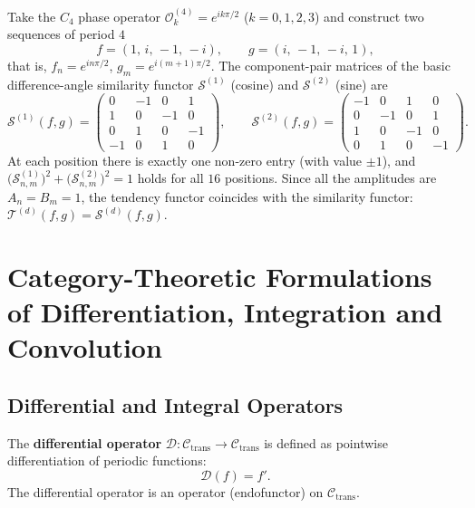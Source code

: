 \begin{example}\label{ch13_c4_similarity_example}
Take the $C_4$ phase operator $\mathcal{O}_k^{(4)} = e^{i k\pi/2}$ ($k = 0,1,2,3$) and construct two sequences of period $4$
\[
f = (1,\, i,\, -1,\, -i), \qquad g = (i,\, -1,\, -i,\, 1),
\]
that is, $f_n = e^{i n\pi/2}$, $g_m = e^{i (m+1)\pi/2}$. The component-pair matrices of the basic difference-angle similarity functor $\mathcal{S}^{(1)}$ (cosine) and $\mathcal{S}^{(2)}$ (sine) are
\[
\mathcal{S}^{(1)}(f, g) =
\begin{pmatrix}
0 & -1 & 0 & 1 \\
1 & 0 & -1 & 0 \\
0 & 1 & 0 & -1 \\
-1 & 0 & 1 & 0
\end{pmatrix}, \qquad
\mathcal{S}^{(2)}(f, g) =
\begin{pmatrix}
-1 & 0 & 1 & 0 \\
0 & -1 & 0 & 1 \\
1 & 0 & -1 & 0 \\
0 & 1 & 0 & -1
\end{pmatrix}.
\]
At each position there is exactly one non-zero entry (with value $\pm 1$), and $\big(\mathcal{S}^{(1)}_{n,m}\big)^2 + \big(\mathcal{S}^{(2)}_{n,m}\big)^2 = 1$ holds for all $16$ positions. Since all the amplitudes are $A_n = B_m = 1$, the tendency functor coincides with the similarity functor: $\mathcal{T}^{(d)}(f, g) = \mathcal{S}^{(d)}(f, g)$.
\end{example}

\section{Category-Theoretic Formulations of Differentiation, Integration and Convolution}\label{sec:diff_int_conv_category}

\subsection{Differential and Integral Operators}

\begin{definition}\label{def:differential_operator}
The \textbf{differential operator} $\mathcal{D}: \mathcal{C}_{\text{trans}} \to \mathcal{C}_{\text{trans}}$ is defined as pointwise differentiation of periodic functions:
\[
\mathcal{D}(f) = f'.
\]
The differential operator is an operator (endofunctor) on $\mathcal{C}_{\text{trans}}$.
\end{definition}

